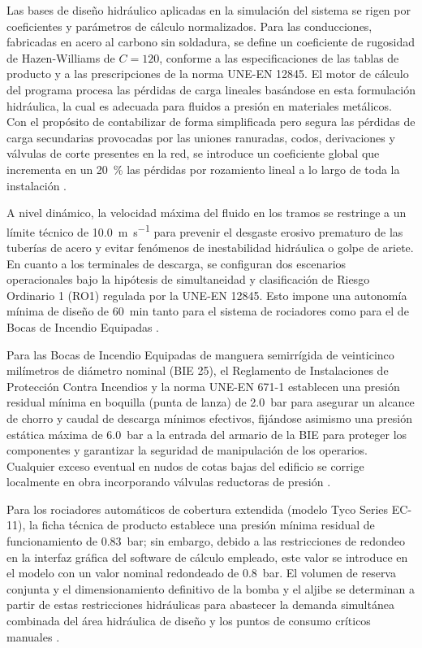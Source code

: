 \documentclass[12pt,a4paper]{article}
\begin{document}
Las bases de diseño hidráulico aplicadas en la simulación del sistema se rigen por coeficientes y parámetros de cálculo normalizados. Para las conducciones, fabricadas en acero al carbono sin soldadura, se define un coeficiente de rugosidad de Hazen-Williams de $C = 120$, conforme a las especificaciones de las tablas de producto y a las prescripciones de la norma UNE-EN 12845. El motor de cálculo del programa procesa las pérdidas de carga lineales basándose en esta formulación hidráulica, la cual es adecuada para fluidos a presión en materiales metálicos. Con el propósito de contabilizar de forma simplificada pero segura las pérdidas de carga secundarias provocadas por las uniones ranuradas, codos, derivaciones y válvulas de corte presentes en la red, se introduce un coeficiente global que incrementa en un \SI{20}{\percent} las pérdidas por rozamiento lineal a lo largo de toda la instalación \parencite{UNE_EN_12845}. 

A nivel dinámico, la velocidad máxima del fluido en los tramos se restringe a un límite técnico de \SI{10.0}{\meter\per\second} para prevenir el desgaste erosivo prematuro de las tuberías de acero y evitar fenómenos de inestabilidad hidráulica o golpe de ariete. En cuanto a los terminales de descarga, se configuran dos escenarios operacionales bajo la hipótesis de simultaneidad y clasificación de Riesgo Ordinario 1 (RO1) regulada por la UNE-EN 12845. Esto impone una autonomía mínima de diseño de \SI{60}{\minute} tanto para el sistema de rociadores como para el de Bocas de Incendio Equipadas \parencite{RIPCI_GUIA_2022,UNE_EN_12845}. 

Para las Bocas de Incendio Equipadas de manguera semirrígida de veinticinco milímetros de diámetro nominal (BIE 25), el Reglamento de Instalaciones de Protección Contra Incendios y la norma UNE-EN 671-1 establecen una presión residual mínima en boquilla (punta de lanza) de \SI{2.0}{\bar} para asegurar un alcance de chorro y caudal de descarga mínimos efectivos, fijándose asimismo una presión estática máxima de \SI{6.0}{\bar} a la entrada del armario de la BIE para proteger los componentes y garantizar la seguridad de manipulación de los operarios. Cualquier exceso eventual en nudos de cotas bajas del edificio se corrige localmente en obra incorporando válvulas reductoras de presión \parencite{RIPCI_GUIA_2022,UNE_EN_671_1}. 

Para los rociadores automáticos de cobertura extendida (modelo Tyco Series EC-11), la ficha técnica de producto establece una presión mínima residual de funcionamiento de \SI{0.83}{\bar}; sin embargo, debido a las restricciones de redondeo en la interfaz gráfica del software de cálculo empleado, este valor se introduce en el modelo con un valor nominal redondeado de \SI{0.8}{\bar}. El volumen de reserva conjunta y el dimensionamiento definitivo de la bomba y el aljibe se determinan a partir de estas restricciones hidráulicas para abastecer la demanda simultánea combinada del área hidráulica de diseño y los puntos de consumo críticos manuales \parencite{TYCO_EC11,UNE_EN_12845}.
\end{document}
